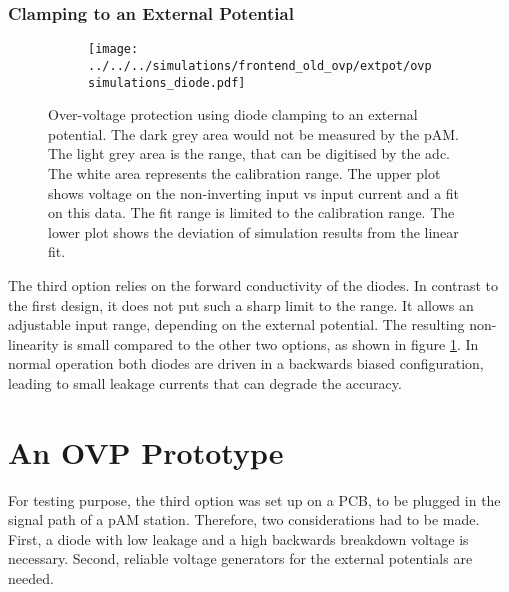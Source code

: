 \subsubsection*{Clamping to an External Potential}
\begin{figure}
	\centering
	\begin{subfigure}{\textwidth}
		\texttt{[image: ../../../simulations/frontend\_old\_ovp/extpot/ovpsimulations\_diode.pdf]}
	\end{subfigure}
	\caption{Over-voltage protection using diode clamping to an external potential. The dark grey area would not be measured by the \ac{pAM}. The light grey area is the range, that can be digitised by the \ac{adc}. The white area represents the calibration range. The upper plot shows voltage on the non-inverting input vs input current and a fit on this data. The fit range is limited to the calibration range. The lower plot shows the deviation of simulation results from the linear fit.}
	\label{fig:ovpprinciples:sim:extpot}
\end{figure}
The third option relies on the forward conductivity of the diodes. In contrast to the first design, it does not put such a sharp limit to the range. It allows an adjustable input range, depending on the external potential. The resulting non-linearity is small compared to the other two options, as shown in figure \ref{fig:ovpprinciples:sim:extpot}. In normal operation both diodes are driven in a backwards biased configuration, leading to small leakage currents that can degrade the accuracy.

\section{An OVP Prototype}
For testing purpose, the third option was set up on a PCB, to be plugged in the signal path of a \ac{pAM} station. Therefore, two considerations had to be made. First, a diode with low leakage and a high backwards breakdown voltage is necessary. Second, reliable voltage generators for the external potentials are needed.
